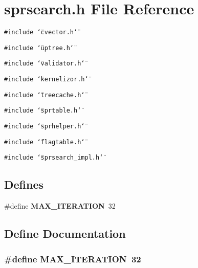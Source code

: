 \section{sprsearch.h File Reference}
\label{sprsearch_8h}
{\tt \#include \char`\"{}cvector.h\char`\"{}}\par
{\tt \#include \char`\"{}uptree.h\char`\"{}}\par
{\tt \#include \char`\"{}validator.h\char`\"{}}\par
{\tt \#include \char`\"{}kernelizor.h\char`\"{}}\par
{\tt \#include \char`\"{}treecache.h\char`\"{}}\par
{\tt \#include \char`\"{}sprtable.h\char`\"{}}\par
{\tt \#include \char`\"{}sprhelper.h\char`\"{}}\par
{\tt \#include \char`\"{}flagtable.h\char`\"{}}\par
{\tt \#include \char`\"{}sprsearch\_\-impl.h\char`\"{}}\par
\subsection*{Defines}
\begin{CompactItemize}
\item 
\#define {\bf MAX\_\-ITERATION}~32
\end{CompactItemize}


\subsection{Define Documentation}
\subsubsection{\setlength{\rightskip}{0pt plus 5cm}\#define MAX\_\-ITERATION~32}\label{sprsearch_8h_a0}


